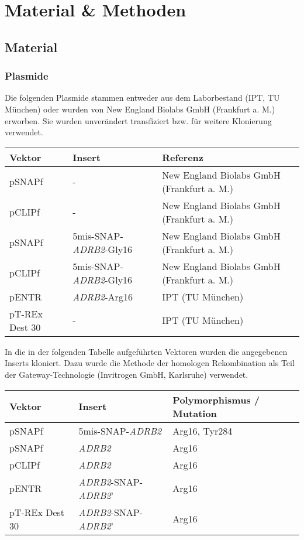 \chapter{Material \& Methoden}\label{chapter:materialmethoden}

\section{Material}
\subsection{Plasmide} \label{plasmide}
Die folgenden Plasmide stammen entweder aus dem Laborbestand (IPT, TU München) oder wurden von New England Biolabs GmbH (Frankfurt a. M.) erworben. Sie wurden unverändert transfiziert bzw. für weitere Klonierung verwendet.

\begin{table}[htsb]
    \begin{tabularx}{\textwidth}{lll}
        \toprule
        Vektor		&	Insert						& 	Referenz	\\
        \midrule
        pSNAPf		&		-						&	New England Biolabs GmbH (Frankfurt a. M.)\\
        pCLIPf		&		-						&	New England Biolabs GmbH (Frankfurt a. M.)\\
        pSNAPf		&	5mis-SNAP-\textit{ADRB2}-Gly16	&	New England Biolabs GmbH (Frankfurt a. M.)\\
        pCLIPf		&	5mis-SNAP-\textit{ADRB2}-Gly16	&	New England Biolabs GmbH (Frankfurt a. M.)\\
        pENTR	&	\textit{ADRB2}-Arg16	   		&	IPT (TU München)\\
        pT-REx Dest 30	&	-   					&	IPT (TU München)\\
    \bottomrule
    \end{tabularx}
\end{table}

In die in der folgenden Tabelle aufgeführten Vektoren wurden die angegebenen Inserts kloniert. Dazu wurde die Methode der homologen Rekombination als Teil der Gateway-Technologie (Invitrogen GmbH, Karlsruhe) verwendet.

\begin{table}[htsb]
\begin{tabularx}{\textwidth}{lll}
\toprule
Vektor		&	Insert		&	Polymorphismus / Mutation\\
\midrule
pSNAPf		&	5mis-SNAP-\textit{ADRB2}	&	Arg16, Tyr284\\
pSNAPf		&	\textit{ADRB2}		&	Arg16\\
pCLIPf		&	\textit{ADRB2}		&	Arg16\\
pENTR		&	\textit{ADRB2}-SNAP-\textit{ADRB2}'	& Arg16\\
pT-REx Dest 30	& \textit{ADRB2}-SNAP-\textit{ADRB2}'	& Arg16\\
\bottomrule
\end{tabularx}
\end{table}

